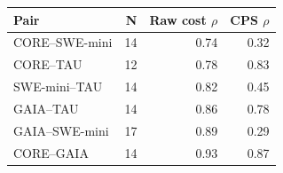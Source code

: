 \begin{tabular}{lrrr}
\toprule
Pair & N & Raw cost $\rho$ & CPS $\rho$ \\
\midrule
CORE--SWE-mini & 14 & 0.74 & 0.32 \\
CORE--TAU & 12 & 0.78 & 0.83 \\
SWE-mini--TAU & 14 & 0.82 & 0.45 \\
GAIA--TAU & 14 & 0.86 & 0.78 \\
GAIA--SWE-mini & 17 & 0.89 & 0.29 \\
CORE--GAIA & 14 & 0.93 & 0.87 \\
\bottomrule
\end{tabular}
